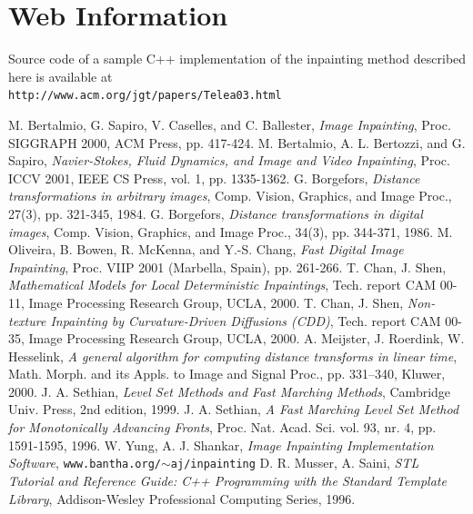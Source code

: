 \documentclass{llncs}
\begin{document}
\section*{Web Information}
%
  Source code of a sample C++ implementation of the inpainting method
described here is available at\\
\texttt{http://www.acm.org/jgt/papers/Telea03.html}
%
%
%
%
\begin{thebibliography}{13}
%
   {\sc M. Bertalmio, G. Sapiro, V. Caselles, and C. Ballester},
   {\em Image Inpainting}, Proc. SIGGRAPH 2000, ACM Press, pp. 417-424.
   {\sc M. Bertalmio, A. L. Bertozzi, and G. Sapiro},
   {\em Navier-Stokes, Fluid Dynamics, and Image and Video Inpainting},
   Proc. ICCV 2001, IEEE CS Press, vol. 1, pp. 1335-1362.
   {\sc G. Borgefors},
   {\em Distance transformations in arbitrary images},
   Comp. Vision, Graphics, and Image Proc., 27(3), pp. 321-345, 1984.
   {\sc G. Borgefors},
   {\em Distance transformations in digital images},
   Comp. Vision, Graphics, and Image Proc., 34(3), pp. 344-371, 1986.
   {\sc M. Oliveira, B. Bowen, R. McKenna, and Y.-S. Chang},
   {\em Fast Digital Image Inpainting},
   Proc. VIIP 2001 (Marbella, Spain), pp. 261-266.
   {\sc T. Chan, J. Shen}, 
   {\em Mathematical Models for Local Deterministic Inpaintings},
   Tech. report CAM 00-11, Image Processing Research Group, UCLA, 2000.
   {\sc T. Chan, J. Shen},
   {\em Non-texture Inpainting by Curvature-Driven Diffusions (CDD)},
   Tech. report CAM 00-35, Image Processing Research Group, UCLA, 2000.
   {\sc A. Meijster, J. Roerdink, W. Hesselink},
   {\em A general algorithm for computing distance transforms in linear time},
   Math. Morph. and its Appls. to Image and Signal Proc., pp. 331--340, Kluwer, 2000.
   {\sc J. A. Sethian},
   {\em Level Set Methods and Fast Marching Methods},
   Cambridge Univ. Press, 2nd edition, 1999.
   {\sc J. A. Sethian},
   {\em A Fast Marching Level Set Method for Monotonically Advancing Fronts},
   Proc. Nat. Acad. Sci. vol. 93, nr. 4, pp. 1591-1595, 1996. 
   {\sc W. Yung, A. J. Shankar},
   {\em Image Inpainting Implementation Software}, \texttt{www.bantha.org/$\sim$aj/inpainting}
  {\sc D. R. Musser, A. Saini},
  {\em STL Tutorial and Reference Guide: C++
   Programming with the Standard Template Library},
  Addison-Wesley Professional Computing Series, 1996.
   

\end{thebibliography}


%
%
%
%
\end{document}
